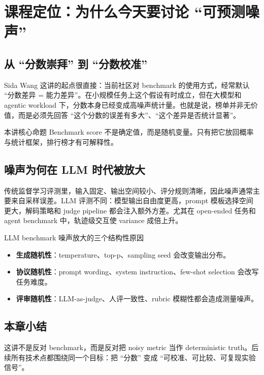 \section{课程定位：为什么今天要讨论 ``可预测噪声''}

\subsection{从 ``分数崇拜'' 到 ``分数校准''}
Sida Wang 这讲的起点很直接：当前社区对 benchmark 的使用方式，经常默认 ``分数差异 = 能力差异''。在小规模任务上这个假设有时成立，但在大模型和 agentic workload 下，分数本身已经变成高噪声统计量。也就是说，榜单并非无价值，而是必须先回答 ``这个分数的误差有多大''、``这个差异是否统计显著''。

\begin{importantbox}{本讲核心命题}
Benchmark score 不是确定值，而是随机变量。只有把它放回概率与统计框架，排行榜才有可解释性。
\end{importantbox}

\subsection{噪声为何在 LLM 时代被放大}
传统监督学习评测里，输入固定、输出空间较小、评分规则清晰，因此噪声通常主要来自采样误差。LLM 评测不同：模型输出自由度更高，prompt 模板选择空间更大，解码策略和 judge pipeline 都会注入额外方差。尤其在 open-ended 任务和 agent benchmark 中，轨迹级交互使 variance 成倍上升。

\begin{knowledgebox}{LLM benchmark 噪声放大的三个结构性原因}
\begin{itemize}
    \item \textbf{生成随机性}：temperature、top-p、sampling seed 会改变输出分布。
    \item \textbf{协议随机性}：prompt wording、system instruction、few-shot selection 会改写任务难度。
    \item \textbf{评审随机性}：LLM-as-judge、人评一致性、rubric 模糊性都会造成测量噪声。
\end{itemize}
\end{knowledgebox}

\subsection{本章小结}
这讲不是反对 benchmark，而是反对把 noisy metric 当作 deterministic truth。后续所有技术点都围绕同一个目标：把 ``分数'' 变成 ``可校准、可比较、可复现实验信号''。


